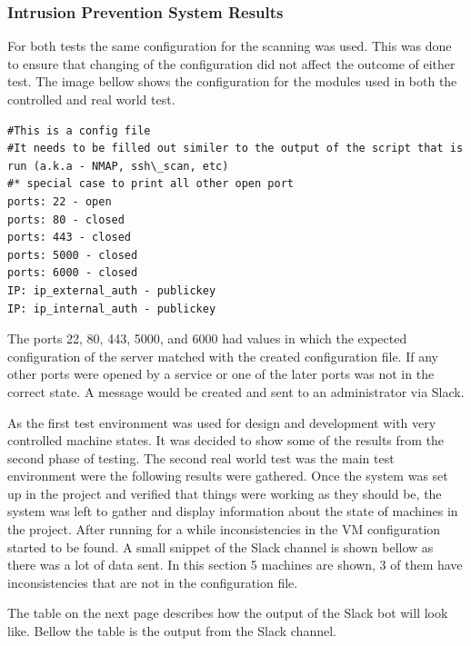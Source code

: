 \documentclass[12pt]{article}
\begin{document}
\subsubsection{Intrusion Prevention System Results}
For both tests the same configuration for the scanning was used. This was done to ensure that changing of the configuration did not affect the outcome of either test. The image bellow shows the configuration for the modules used in both the controlled and real world test.

\begin{mdframed}
    \begin{lstlisting}
#This is a config file
#It needs to be filled out similer to the output of the script that is run (a.k.a - NMAP, ssh\_scan, etc)
#* special case to print all other open port
ports: 22 - open
ports: 80 - closed
ports: 443 - closed
ports: 5000 - closed
ports: 6000 - closed
IP: ip_external_auth - publickey
IP: ip_internal_auth - publickey
    \end{lstlisting}
\end{mdframed}
The ports 22, 80, 443, 5000, and 6000 had values in which the expected configuration of the server matched with the created configuration file. If any other ports were opened by a service or one of the later ports was not in the correct state. A message would be created and sent to an administrator via Slack.

As the first test environment was used for design and development with very controlled machine states. It was decided to show some of the results from the second phase of testing. The second real world test was the main test environment were the following results were gathered. Once the system was set up in the project and verified that things were working as they should be, the system was left to gather and display information about the state of machines in the project.  After running for a while inconsistencies in the VM configuration started to be found. A small snippet of the Slack channel is shown bellow as there was a lot of data sent. In this section 5 machines are shown, 3 of them have inconsistencies that are not in the configuration file.

The table on the next page describes how the output of the Slack bot will look like. Bellow the table is the output from the Slack channel.
\end{document}
